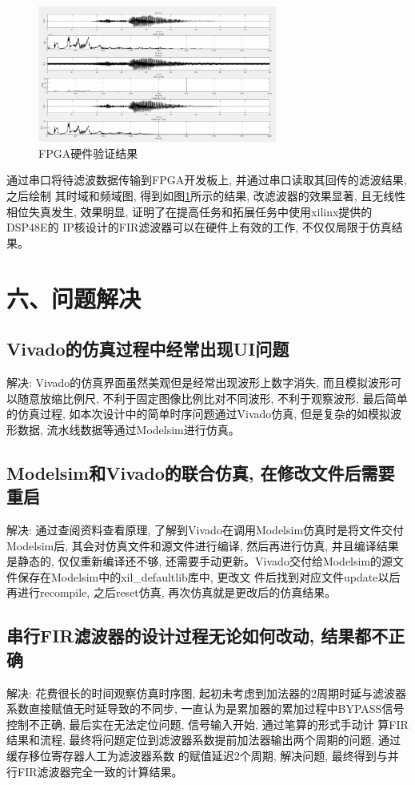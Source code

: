 \documentclass{article}
\newcommand{\fourhao}{\fontsize{14pt}{\baselineskip}\selectfont} %
\newcommand{\xiaosihao}{\fontsize{12pt}{\baselineskip}\selectfont} %
\begin{document}
\begin{figure}[H]
    \centering
    \includegraphics[width=0.7\textwidth]{image/2024-06-27-21-57-44.png}
    \caption{FPGA硬件验证结果}
    \label{image_verify_hardware_2}
\end{figure}
通过串口将待滤波数据传输到FPGA开发板上, 并通过串口读取其回传的滤波结果, 之后绘制
其时域和频域图, 得到如图\ref{image_verify_hardware_2}所示的结果, 改滤波器的效果显著, 
且无线性相位失真发生, 效果明显, 证明了在提高任务和拓展任务中使用xilinx提供的DSP48E的
IP核设计的FIR滤波器可以在硬件上有效的工作, 不仅仅局限于仿真结果。
\section*{\fourhao 六、问题解决}
\xiaosihao
{}
\subsection*{Vivado的仿真过程中经常出现UI问题}
解决: Vivado的仿真界面虽然美观但是经常出现波形上数字消失, 而且模拟波形可以随意放缩比例尺, 不利于固定图像比例比对不同波形, 
不利于观察波形, 最后简单的仿真过程, 如本次设计中的简单时序问题通过Vivado仿真, 但是复杂的如模拟波形数据, 流水线数据等通过Modelsim进行仿真。
\subsection*{Modelsim和Vivado的联合仿真, 在修改文件后需要重启}
解决: 通过查阅资料查看原理, 了解到Vivado在调用Modelsim仿真时是将文件交付Modelsim后, 其会对仿真文件和源文件进行编译, 然后再进行仿真, 
并且编译结果是静态的, 仅仅重新编译还不够, 还需要手动更新。Vivado交付给Modelsim的源文件保存在Modelsim中的xil\_defaultlib库中, 更改文
件后找到对应文件update以后再进行recompile, 之后reset仿真, 再次仿真就是更改后的仿真结果。 
\subsection*{串行FIR滤波器的设计过程无论如何改动, 结果都不正确}
解决: 花费很长的时间观察仿真时序图, 起初未考虑到加法器的2周期时延与滤波器系数直接赋值无时延导致的不同步,
一直认为是累加器的累加过程中BYPASS信号控制不正确, 最后实在无法定位问题, 信号输入开始, 通过笔算的形式手动计
算FIR结果和流程, 最终将问题定位到滤波器系数提前加法器输出两个周期的问题, 通过缓存移位寄存器人工为滤波器系数
的赋值延迟2个周期, 解决问题, 最终得到与并行FIR滤波器完全一致的计算结果。
\end{document}
